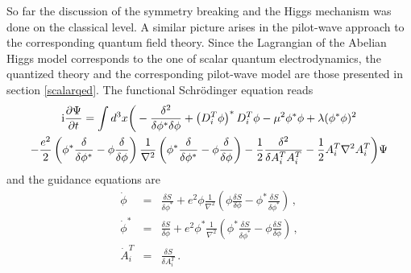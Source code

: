 \documentclass[12pt]{article}
\def\ii{\textrm i}
\begin{document}
So far the discussion of the symmetry breaking and the Higgs mechanism was done on the classical level. A similar picture arises in the pilot-wave approach to the corresponding quantum field theory. Since the Lagrangian of the Abelian Higgs model corresponds to the one of scalar quantum electrodynamics, the quantized theory and the corresponding pilot-wave model are those presented in section \ref{scalarqed}. The functional Schr\"o\-ding\-er equation reads
\begin{multline}
\ii\frac{\partial \Psi}{\partial t} =   \int d^3 x \bigg(-\frac{ \delta^2  }{ \delta { \phi}^* \delta { \phi}} + \left(D^T_{i} { \phi}  \right)^{*}  D^T_{i} { \phi}  - \mu^2 { \phi}^* { \phi} +  \lambda(\phi^*\phi)^2  \\
- \frac{e^2}{2} \left({ \phi}^* \frac{ \delta  }{ \delta { \phi}^*} -  { \phi} \frac{ \delta }{ \delta { \phi}} \right) \frac{1}{\nabla^2} \left({ \phi}^* \frac{ \delta  }{ \delta { \phi}^*} -  { \phi} \frac{ \delta }{ \delta { \phi}} \right) - \frac{1}{2} \frac{\delta^2}{ \delta { A}^T_i { A}^T_i} -  \frac{1}{2} { A}^T_i \nabla^2 { A}^T_i \bigg)\Psi 
\label{h.8}
\end{multline}
and the guidance equations are 
\begin{eqnarray}
{\dot{ \phi} }  &=&  \frac{\delta S}{\delta { \phi}^* }  + e^2  { \phi} \frac{1}{\nabla^2} \left(  { \phi}\frac{\delta S}{\delta { \phi} } - { \phi}^*\frac{\delta S}{\delta { \phi}^* } \right) \,,  \nonumber\\ 
{\dot{ \phi} }^*  &=&  \frac{\delta S}{\delta { \phi} }  + e^2  { \phi}^* \frac{1}{\nabla^2} \left( { \phi}^*\frac{\delta S}{\delta { \phi}^* }- { \phi}\frac{\delta S}{\delta { \phi} }  \right) \,,  \nonumber\\ 
{\dot{ A}^T_i } &=&  \frac{\delta S}{\delta { A}^T_i  } \,.
\label{h.9}
\end{eqnarray}
\end{document}
